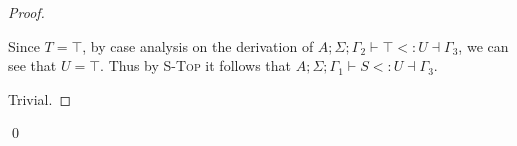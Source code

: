 \documentclass{llncs}
\numberwithin{subsubcase}{subcase}
\numberwithin{subcase}{casethm}
\numberwithin{casethm}{theorem}
\numberwithin{casethm}{lemma}
\begin{document}
\begin{proof}
\begin{casethm}
Since $T = \top$, by case analysis on the derivation of 
$A; \Sigma; \Gamma_2 \vdash \top <: U \dashv \Gamma_3$,
we can see that $U = \top$. Thus by \textsc{S-Top} it follows that
$A; \Sigma; \Gamma_1 \vdash S <: U \dashv \Gamma_3$.
\end{casethm}

\begin{casethm}
\end{casethm}
Trivial.
\end{proof}
\qed

\newpage
\end{document}
